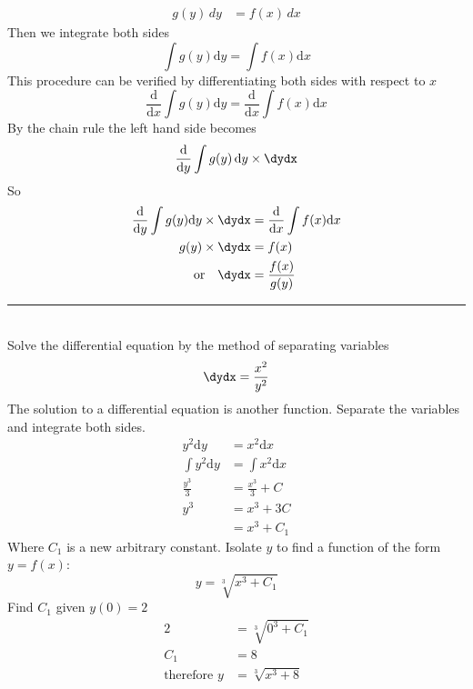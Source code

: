 \begin{align*}
g (y)\, d y &=f (x)\, d x
\end{align*}
Then we integrate both sides
\begin{equation*}\int g (y) \mathrm{d} y =\int f (x) \mathrm{d} x
\end{equation*}This procedure can be verified by differentiating both sides with respect to $x$
\begin{equation*}\frac{\mathrm{d}}{\mathrm{d} x} \int g (y) \mathrm{d} y =\frac{\mathrm{d}}{\mathrm{d} x} \int f (x) \mathrm{d} x
\end{equation*}By the chain rule the left hand side becomes
\begin{equation*}\frac{\mathrm{d}}{\mathrm{d} y} \int g (y) \,\mathrm{d} y \times \dydx
\end{equation*}So
\begin{align*}\frac{\mathrm{d}}{\mathrm{d} y} \int g (y) \mathrm{d} y \times \dydx &    = \frac{\mathrm{d}}{\mathrm{d} x} \int f (x) \mathrm{d} x \\
g (y) \times \dydx &    = f (x) \\
\text{or\  \  \ }\dydx &    = \frac{f (x)}{g (y)}\end{align*}
\rule{6.8cm}{0.5pt}\\
\example Solve the differential equation by the method of separating variables \[ \dydx =\frac{x^{2}}{y^{2}}\]
\solution The solution to a differential equation is another function. Separate the variables and integrate both sides.
\begin{align*}y^{2} \mathrm{d} y &    = x^{2} \mathrm{d} x \\
\int y^{2} \mathrm{d} y &    = \int x^{2} \mathrm{d} x \\
\frac{y^{3}}{3} &    = \frac{x^{3}}{3} +C \\
y^{3} &    = x^{3} +3 C \\
 &    = x^{3} +C_{1}\end{align*}Where $C_{1}$ is a new arbitrary constant. Isolate $y$ to find a function of the form $y=f(x)$:
\begin{equation*}y =\sqrt[{3}]{x^{3} +C_{1}}
\end{equation*}Find $C_{1}$ given $y (0) =2$
\begin{align*}2 &    = \sqrt[{3}]{0^{3} +C_{1}} \\
C_{1} &    = 8 \\
\text{therefore }y &    = \sqrt[{3}]{x^{3} +8}\end{align*}

